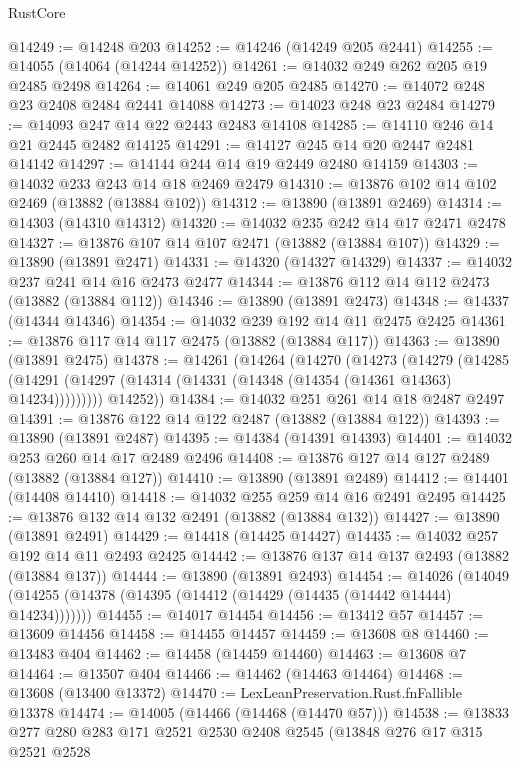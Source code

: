 \begin{lexlean}{RustCore}
\begin{coremodule}
@14249 := @14248 @203
@14252 := @14246 (@14249 @205 @2441)
@14255 := @14055 (@14064 (@14244 @14252))
@14261 := @14032 @249 @262 @205 @19 @2485 @2498
@14264 := @14061 @249 @205 @2485
@14270 := @14072 @248 @23 @2408 @2484 @2441 @14088
@14273 := @14023 @248 @23 @2484
@14279 := @14093 @247 @14 @22 @2443 @2483 @14108
@14285 := @14110 @246 @14 @21 @2445 @2482 @14125
@14291 := @14127 @245 @14 @20 @2447 @2481 @14142
@14297 := @14144 @244 @14 @19 @2449 @2480 @14159
@14303 := @14032 @233 @243 @14 @18 @2469 @2479
@14310 := @13876 @102 @14 @102 @2469 (@13882 (@13884 @102))
@14312 := @13890 (@13891 @2469)
@14314 := @14303 (@14310 @14312)
@14320 := @14032 @235 @242 @14 @17 @2471 @2478
@14327 := @13876 @107 @14 @107 @2471 (@13882 (@13884 @107))
@14329 := @13890 (@13891 @2471)
@14331 := @14320 (@14327 @14329)
@14337 := @14032 @237 @241 @14 @16 @2473 @2477
@14344 := @13876 @112 @14 @112 @2473 (@13882 (@13884 @112))
@14346 := @13890 (@13891 @2473)
@14348 := @14337 (@14344 @14346)
@14354 := @14032 @239 @192 @14 @11 @2475 @2425
@14361 := @13876 @117 @14 @117 @2475 (@13882 (@13884 @117))
@14363 := @13890 (@13891 @2475)
@14378 := @14261
    (@14264
      (@14270
        (@14273
          (@14279
            (@14285 (@14291 (@14297 (@14314 (@14331 (@14348 (@14354 (@14361 @14363) @14234)))))))))
        @14252))
@14384 := @14032 @251 @261 @14 @18 @2487 @2497
@14391 := @13876 @122 @14 @122 @2487 (@13882 (@13884 @122))
@14393 := @13890 (@13891 @2487)
@14395 := @14384 (@14391 @14393)
@14401 := @14032 @253 @260 @14 @17 @2489 @2496
@14408 := @13876 @127 @14 @127 @2489 (@13882 (@13884 @127))
@14410 := @13890 (@13891 @2489)
@14412 := @14401 (@14408 @14410)
@14418 := @14032 @255 @259 @14 @16 @2491 @2495
@14425 := @13876 @132 @14 @132 @2491 (@13882 (@13884 @132))
@14427 := @13890 (@13891 @2491)
@14429 := @14418 (@14425 @14427)
@14435 := @14032 @257 @192 @14 @11 @2493 @2425
@14442 := @13876 @137 @14 @137 @2493 (@13882 (@13884 @137))
@14444 := @13890 (@13891 @2493)
@14454 := @14026
    (@14049 (@14255 (@14378 (@14395 (@14412 (@14429 (@14435 (@14442 @14444) @14234)))))))
@14455 := @14017 @14454
@14456 := @13412 @57
@14457 := @13609 @14456
@14458 := @14455 @14457
@14459 := @13608 @8
@14460 := @13483 @404
@14462 := @14458 (@14459 @14460)
@14463 := @13608 @7
@14464 := @13507 @404
@14466 := @14462 (@14463 @14464)
@14468 := @13608 (@13400 @13372)
@14470 := LexLeanPreservation.Rust.fnFallible @13378
@14474 := @14005 (@14466 (@14468 (@14470 @57)))
@14538 := @13833
    @277
    @280
    @283
    @171
    @2521
    @2530
    @2408
    @2545
    (@13848
      @276
      @17
      @315
      @2521
      @2528

\end{coremodule}
\end{lexlean}
